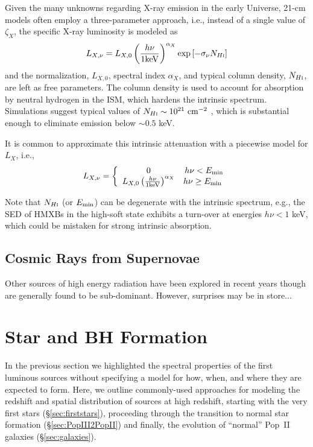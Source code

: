 Given the many unknowns regarding X-ray emission in the early Universe, 21-cm models often employ a three-parameter approach, i.e., instead of a single value of $\zeta_X$, the specific X-ray luminosity is modeled as 
\begin{equation}
	L_{X,\nu} = L_{X,0} \left(\frac{h \nu}{1 \mathrm{keV}} \right)^{\alpha_X} \exp\left[-\sigma_{\nu} N_{H\textsc{i}} \right]
\end{equation}
and the normalization, $L_{X,0}$, spectral index $\alpha_X$, and typical column density, $N_{H\textsc{i}}$, are left as free parameters. The column density is used to account for absorption by neutral hydrogen in the ISM, which hardens the intrinsic spectrum. Simulations suggest typical values of $N_{H\textsc{i}} \sim 10^{21} \ \mathrm{cm}^{-2}$ \cite{Das2017}, which is substantial enough to eliminate emission below $\sim 0.5$ keV. 

It is common to approximate this intrinsic attenuation with a piecewise model for $L_X$, i.e., 
\begin{align}
L_{X,\nu} = \left\{ \begin{array}{cc} 
                0 & h\nu < E_{\min} \\
                L_{X,0} \left(\frac{h \nu}{1 \mathrm{keV}} \right)^{\alpha_X} & h\nu \geq E_{\min} \
                \end{array} \right.
\end{align}


Note that $N_{H\textsc{i}}$ (or $E_{\min}$) can be degenerate with the intrinsic spectrum, e.g., the SED of HMXBs in the high-soft state exhibits a turn-over at energies $h\nu < 1$ keV, which could be mistaken for strong intrinsic absorption.


\subsection{Cosmic Rays from Supernovae}
{\color{red} Other sources of high energy radiation have been explored in recent years though are generally found to be sub-dominant. However, surprises may be in store...}



\section{Star and BH Formation} \label{sec:sfrd}
In the previous section we highlighted the spectral properties of the first luminous sources without specifying a model for how, when, and where they are expected to form. Here, we outline commonly-used approaches for modeling the redshift and spatial distribution of sources at high redshift, starting with the very first stars (\S\ref{sec:firststars}), proceeding through the transition to normal star formation (\S\ref{sec:PopIII2PopII}) and finally, the evolution of ``normal'' Pop~II galaxies (\S\ref{sec:galaxies}). 

